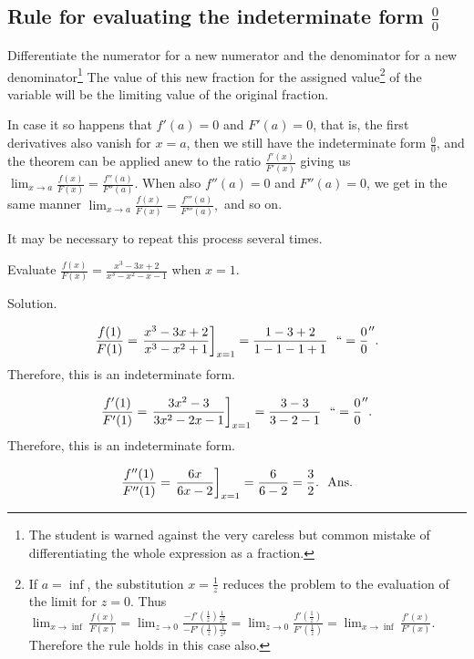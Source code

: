 \subsection{Rule for evaluating the indeterminate form $\frac{0}{0}$}

Differentiate the numerator for a new numerator and the denominator 
for a new denominator\footnote{The student is warned against the very 
careless but common mistake of differentiating the whole expression as a fraction.}
The value of this new fraction for the assigned value\footnote{If 
$a = \inf$, the substitution $x = \frac{1}{z}$ reduces the problem to the 
evaluation of the limit for $z = 0$. Thus 
$\lim_{x \to \inf} \frac{f(x)}{F(x)} 
= \lim_{z \to 0} \frac{ -f' \left( \frac{1}{z} \right) 
\frac{1}{z^2} }{ -F' \left( \frac{1}{z} \right) \frac{1}{z^2} } 
= \lim_{z \to 0} \frac{f' \left( \frac{1}{z} \right)}{F' \left( \frac{1}{z} \right)} 
= \lim_{x \to \inf} \frac{f'(x)}{F'(x)}$. Therefore the rule holds in this case also.}
of the variable will be the limiting value of the original fraction.

In case it so happens that
$f'(a) = 0$ and $F'(a) = 0$,
that is, the first derivatives also vanish for $x = a$, then we 
still have the indeterminate form $\frac{0}{0}$, and the theorem can be 
applied anew to the ratio
$\frac{f'(x)}{F'(x)}$
giving us
$
\lim_{x \to a} \frac{f(x)}{F(x)} = \frac{f''(a)}{F''(a)}. 
$
When also $f''(a) = 0$ and $F''(a) = 0$, we get in the same manner
$
\lim_{x \to a} \frac{f(x)}{F(x)} = \frac{f'''(a)}{F'''(a)},
$
and so on.

It may be necessary to repeat this process several times.

\begin{example}
Evaluate $\frac{f(x)}{F(x)} = \frac{x^3 - 3x + 2}{x^3 - x^2 - x - 1}$ 
when $x = 1$.

Solution. 	

\[
\frac{f(1)}{F(1)} = \left. \frac{x^3 - 3x + 2}{x^3 - x^2 + 1} \right]_{x = 1} 
= \frac{1 - 3 + 2}{1 - 1 - 1 + 1} \ \ ``= \frac{0}{0}''.
\]
Therefore, this is an indeterminate form.

\[
\frac{f'(1)}{F'(1)} = \left. \frac{3x^2 - 3}{3x^2 - 2x - 1} \right]_{x = 1} 
= \frac{3 - 3}{3 - 2 - 1}\ \ `` = \frac{0}{0}''.
\]
Therefore, this is an indeterminate form.

\[
\frac{f''(1)}{F''(1)} = \left. \frac{6x}{6x - 2} \right]_{x = 1} 
= \frac{6}{6 - 2} = \frac{3}{2}. \ \ {\rm Ans.}
\]
\end{example}

